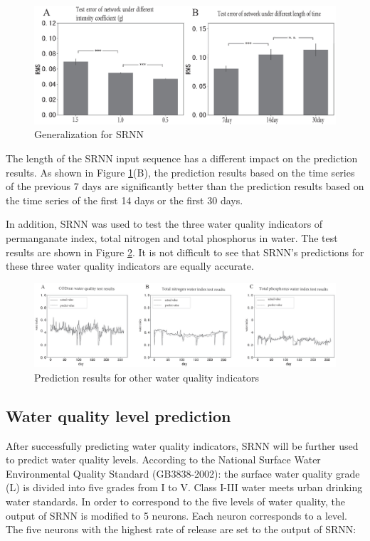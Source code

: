 \documentclass[runningheads]{llncs}
\begin{document}
\begin{figure}[htbp]
\centering
\includegraphics[width=\columnwidth]{Generalization_for_SRNN}
\caption{Generalization for SRNN}
\label{Generalization for SRNN}
\end{figure}

The length of the SRNN input sequence has a different impact on the prediction results. 
As shown in Figure \ref{Generalization for SRNN}(B), the prediction 
results based on the time series of the 
previous 7 days are significantly better than the prediction results 
based on the time series of the first 14 days or the first 30 days.

In addition, SRNN was used to test the three water quality indicators of 
permanganate index, total nitrogen and total phosphorus in water. 
The test results are shown in Figure \ref{Prediction results for other water quality indicators}. 
It is not difficult to see that 
SRNN's predictions for these three water quality indicators are equally accurate.
\begin{figure}[htbp]
\centering
\includegraphics[width=\columnwidth]{Prediction_results_for_other_water_quality_indicators}
\caption{Prediction results for other water quality indicators}
\label{Prediction results for other water quality indicators}
\end{figure}

\subsection{Water quality level prediction}
After successfully predicting water quality indicators, 
SRNN will be further used to predict water quality levels. 
According to the National Surface Water Environmental Quality Standard (GB3838-2002): 
the surface water quality grade (L) is divided into 
five grades from I to V. Class I-III water meets urban drinking water standards. 
In order to correspond to the five levels of water quality, the output of 
SRNN is modified to 5 neurons. Each neuron corresponds to a level. 
The five neurons with the highest rate of release are set to the output of SRNN:
\end{document}
